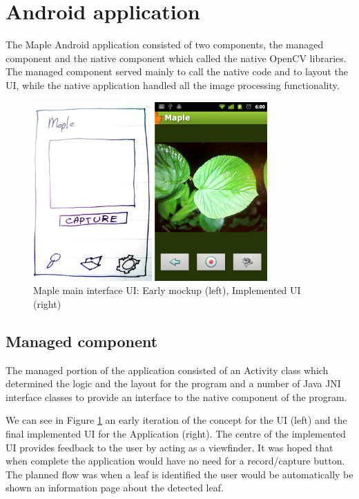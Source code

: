 \section{Android application}
The Maple Android application consisted of two components, the managed component and the native component which called the native OpenCV libraries. The managed component served mainly to call the native code and to layout the UI, while the native application handled all the image processing functionality.

\begin{figure}[h!]
\centering
    \includegraphics[width=0.8\textwidth]{implementation/images/mainscreen_mockup.png}
    \caption{Maple main interface UI: Early mockup (left), Implemented UI (right)}%
    \label{mainscreen_mockup}
\end{figure}

\subsection{Managed component}
The managed portion of the application consisted of an Activity class which determined the logic and the layout for the program and a number of Java JNI interface classes to provide an interface to the native component of the program.

We can see in Figure \ref{mainscreen_mockup} an early iteration of the concept for the UI (left) and the final implemented UI for the Application (right). The centre of the implemented UI provides feedback to the user by acting as a viewfinder. It was hoped that when complete the application would have no need for a record/capture button. The planned flow was when a leaf is identified the user would be automatically be shown an information page about the detected leaf. 

